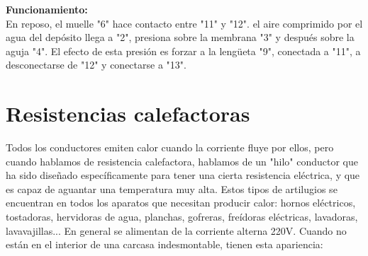 \documentclass[a5paper,twoside,openany]{book}
\begin{document}
\textbf{Funcionamiento:\\}
En reposo, el muelle "6" hace contacto entre "11" y "12".
el aire comprimido por el agua del depósito llega a "2", presiona sobre la membrana "3" y después sobre la aguja "4".
El efecto de esta presión es forzar a la lengüeta "9", conectada a "11", a 
desconectarse de "12" y conectarse a "13".

\newpage
\section{Resistencias calefactoras}

Todos los conductores emiten calor cuando la corriente fluye por ellos, pero cuando hablamos de resistencia calefactora, hablamos de un "hilo" conductor que ha sido diseñado específicamente para tener una cierta resistencia eléctrica, y que es capaz de aguantar una temperatura muy alta.
Estos tipos de artilugios se encuentran en todos los aparatos que necesitan producir calor: hornos eléctricos, tostadoras, hervidoras de agua, planchas, gofreras, freídoras eléctricas, lavadoras, lavavajillas...
En general se alimentan de la corriente alterna 220V. Cuando no están en el interior de una carcasa indesmontable, tienen esta apariencia:
\end{document}
